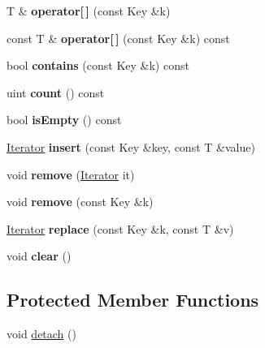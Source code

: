 \begin{DoxyCompactItemize}
T \& {\bfseries operator\mbox{[}$\,$\mbox{]}} (const Key \&k)
\item 
\mbox{\label{class_q_map_a6deaa57b9c566fedcb47b110d556ad3a}} 
const T \& {\bfseries operator\mbox{[}$\,$\mbox{]}} (const Key \&k) const
\item 
\mbox{\label{class_q_map_a3fbf45ee3c3be1a9855e9d04c67d7682}} 
bool {\bfseries contains} (const Key \&k) const
\item 
\mbox{\label{class_q_map_adfea57e6ba83f5786850d1c8be421e22}} 
uint {\bfseries count} () const
\item 
\mbox{\label{class_q_map_a6f715bb4c9b621f97a361eeb92909999}} 
bool {\bfseries is\+Empty} () const
\item 
\mbox{\label{class_q_map_a59b52d230332c95b476d1796a167de36}} 
\mbox{\hyperlink{class_q_map_aa920e1d34440b34269b350ab96bd73d0}{Iterator}} {\bfseries insert} (const Key \&key, const T \&value)
\item 
\mbox{\label{class_q_map_ab8bbc88a58eaad6384e281c86461d0f4}} 
void {\bfseries remove} (\mbox{\hyperlink{class_q_map_aa920e1d34440b34269b350ab96bd73d0}{Iterator}} it)
\item 
\mbox{\label{class_q_map_a2223f1307c21d160dde58606a9c4377f}} 
void {\bfseries remove} (const Key \&k)
\item 
\mbox{\label{class_q_map_a37e604bb752b9a8aa0a4bfc293b75a38}} 
\mbox{\hyperlink{class_q_map_aa920e1d34440b34269b350ab96bd73d0}{Iterator}} {\bfseries replace} (const Key \&k, const T \&v)
\item 
\mbox{\label{class_q_map_a52ef8f9a9c270b1dbf18ccaecdb964a4}} 
void {\bfseries clear} ()
\end{DoxyCompactItemize}
\subsection*{Protected Member Functions}
\begin{DoxyCompactItemize}
\item 
void \mbox{\hyperlink{class_q_map_a6913ba3a784e35a4b0d274f229af92ea}{detach}} ()
\end{DoxyCompactItemize}

